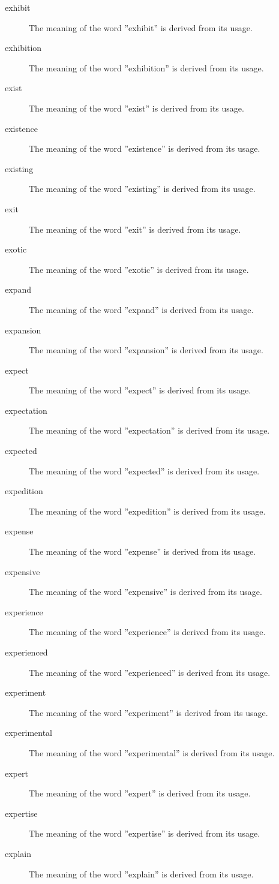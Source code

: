 \documentclass[12pt, letterpaper]{memoir}
\begin{document}
\begin{description}
\item[exhibit] The meaning of the word ''exhibit'' is derived from its usage.
\item[exhibition] The meaning of the word ''exhibition'' is derived from its usage.
\item[exist] The meaning of the word ''exist'' is derived from its usage.
\item[existence] The meaning of the word ''existence'' is derived from its usage.
\item[existing] The meaning of the word ''existing'' is derived from its usage.
\item[exit] The meaning of the word ''exit'' is derived from its usage.
\item[exotic] The meaning of the word ''exotic'' is derived from its usage.
\item[expand] The meaning of the word ''expand'' is derived from its usage.
\item[expansion] The meaning of the word ''expansion'' is derived from its usage.
\item[expect] The meaning of the word ''expect'' is derived from its usage.
\item[expectation] The meaning of the word ''expectation'' is derived from its usage.
\item[expected] The meaning of the word ''expected'' is derived from its usage.
\item[expedition] The meaning of the word ''expedition'' is derived from its usage.
\item[expense] The meaning of the word ''expense'' is derived from its usage.
\item[expensive] The meaning of the word ''expensive'' is derived from its usage.
\item[experience] The meaning of the word ''experience'' is derived from its usage.
\item[experienced] The meaning of the word ''experienced'' is derived from its usage.
\item[experiment] The meaning of the word ''experiment'' is derived from its usage.
\item[experimental] The meaning of the word ''experimental'' is derived from its usage.
\item[expert] The meaning of the word ''expert'' is derived from its usage.
\item[expertise] The meaning of the word ''expertise'' is derived from its usage.
\item[explain] The meaning of the word ''explain'' is derived from its usage.

\end{description}
\end{document}
